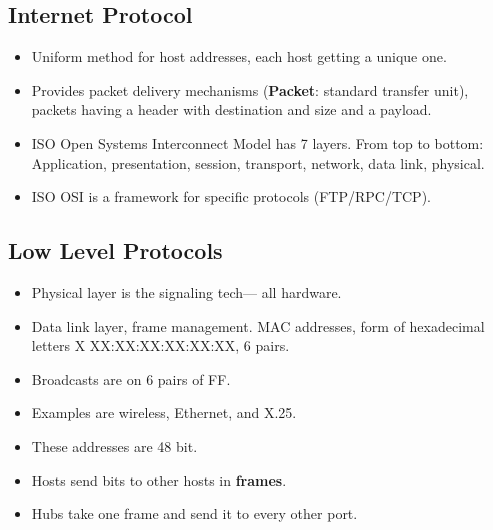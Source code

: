 \documentclass[fontsize=5pt]{scrartcl}
\begin{document}
\begin{multicols}{3}
    \subsection{Internet Protocol}
      \begin{itemize}
        \item Uniform method for host addresses, each host getting a unique one.
        \item Provides packet delivery mechanisms (\textbf{Packet}: standard transfer unit), packets having a header with destination and size and a payload.
        \item ISO Open Systems Interconnect Model has 7 layers. From top to bottom: Application, presentation, session, transport, network, data link, physical.
        \item ISO OSI is a framework for specific protocols (FTP/RPC/TCP).
      \end{itemize}
     \subsection{Low Level Protocols}
       \begin{itemize}
         \item Physical layer is the signaling tech--- all hardware.
         \item Data link layer, frame management. MAC addresses, form of hexadecimal letters X XX:XX:XX:XX:XX:XX, 6 pairs.
         \item Broadcasts are on 6 pairs of FF.
         \item Examples are wireless, Ethernet, and X.25.
         \item These addresses are 48 bit.
         \item Hosts send bits to other hosts in \textbf{frames}.
         \item Hubs take one frame and send it to every other port.
       \end{itemize}

\end{multicols}
\end{document}
